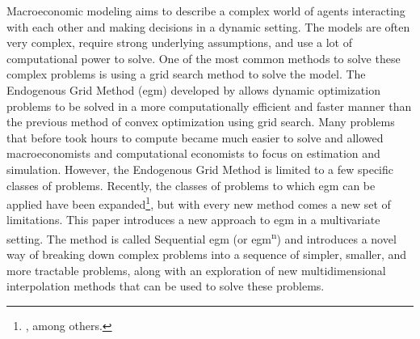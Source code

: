 \documentclass{article}
\begin{document}



Macroeconomic modeling aims to describe a complex world of agents interacting with each other and making decisions in a dynamic setting. The models are often very complex, require strong underlying assumptions, and use a lot of computational power to solve. One of the most common methods to solve these complex problems is using a grid search method to solve the model. The Endogenous Grid Method (\acrshort{egm}) developed by \citet{Carroll2006} allows dynamic optimization problems to be solved in a more computationally efficient and faster manner than the previous method of convex optimization using grid search. Many problems that before took hours to compute became much easier to solve and allowed macroeconomists and computational economists to focus on estimation and simulation. However, the Endogenous Grid Method is limited to a few specific classes of problems. Recently, the classes of problems to which \acrshort{egm} can be applied have been expanded\footnote{\citet{Barillas2007, Maliar2013, Fella2014, White2015, Iskhakov2017}, among others.}, but with every new method comes a new set of limitations. This paper introduces a new approach to \acrshort{egm} in a multivariate setting. The method is called Sequential \acrshort{egm} (or \acrshort{egm}\textsuperscript{n}) and introduces a novel way of breaking down complex problems into a sequence of simpler, smaller, and more tractable problems, along with an exploration of new multidimensional interpolation methods that can be used to solve these problems.
\end{document}
